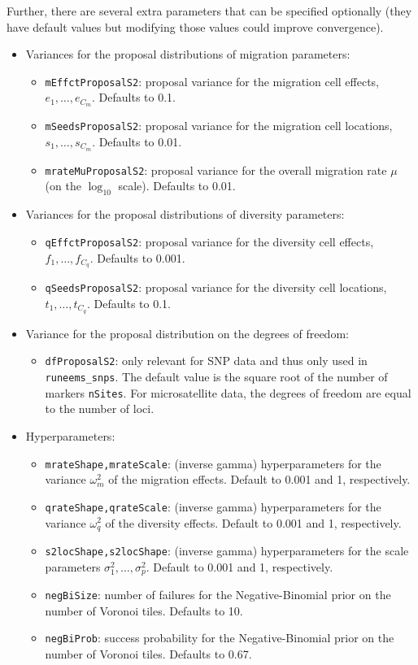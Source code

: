 \documentclass[a4paper,10pt,DIV=15,titlepage,mpinclude=true]{scrartcl}
\newcommand{\keystring}[1]{{\tt #1}}
\begin{document}
Further, there are several extra parameters that can be specified optionally (they have default values but modifying those values could improve convergence).

\begin{itemize}
\item Variances for the proposal distributions of migration parameters:
\begin{itemize}
  \item \keystring{mEffctProposalS2}: proposal variance for the migration cell effects, $e_1,\ldots,e_{C_m}$. Defaults to 0.1.
  \item \keystring{mSeedsProposalS2}: proposal variance for the migration cell locations, $s_1,\ldots,s_{C_m}$. Defaults to 0.01.
  \item \keystring{mrateMuProposalS2}: proposal variance for the overall migration rate $\mu$ (on the $\log_{10}$ scale). Defaults to 0.01.
\end{itemize}
\item Variances for the proposal distributions of diversity parameters:
\begin{itemize}
  \item \keystring{qEffctProposalS2}: proposal variance for the diversity cell effects, $f_1,\ldots,f_{C_q}$. Defaults to 0.001.
  \item \keystring{qSeedsProposalS2}: proposal variance for the diversity cell locations, $t_1,\ldots,t_{C_q}$. Defaults to 0.1.
\end{itemize}
\item Variance for the proposal distribution on the degrees of freedom:
\begin{itemize}
  \item \keystring{dfProposalS2}: only relevant for SNP data and thus only used in \keystring{runeems\_snps}. The default value is the square root of the number of markers \keystring{nSites}. For microsatellite data, the degrees of freedom are equal to the number of loci.
\end{itemize}
\item Hyperparameters:
\begin{itemize}
  \item \keystring{mrateShape,mrateScale}: (inverse gamma) hyperparameters for the variance $\omega_m^2$ of the migration effects. Default to 0.001 and 1, respectively.
  \item \keystring{qrateShape,qrateScale}: (inverse gamma) hyperparameters for the variance $\omega_q^2$ of the diversity effects. Default to 0.001 and 1, respectively.
  \item \keystring{s2locShape,s2locShape}: (inverse gamma) hyperparameters for the scale parameters $\sigma_1^2,\ldots,\sigma_p^2$. Default to 0.001 and 1, respectively.
  \item \keystring{negBiSize}: number of failures for the Negative-Binomial prior on the number of Voronoi tiles. Defaults to 10.
  \item \keystring{negBiProb}: success probability for the Negative-Binomial prior on the number of Voronoi tiles. Defaults to 0.67.
\end{itemize}
\end{itemize}
\end{document}
